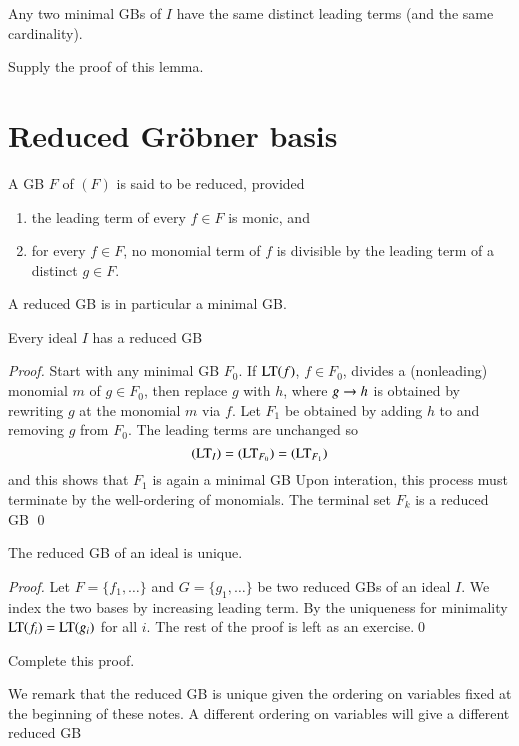 \documentclass{llncs}
\begin{document}
\begin{lemma}  Any two minimal GBs of $I$ have the same distinct leading terms (and the same cardinality).
\end{lemma}

\begin{problem} Supply the proof of this lemma.
\end{problem}


\section{Reduced Gr\"obner basis}

A GB $F$ of $(F)$ is said to be reduced, provided
\begin{enumerate}
\item  the leading term of every $f\in F$ is monic, and
\item  for every $f\in F$, no monomial term of $f$ is divisible by the leading term of a distinct $g\in F$.
\end{enumerate}

A reduced GB is in particular a minimal GB.

\begin{lemma} Every ideal $I$ has a reduced GB
\end{lemma}

\begin{proof}
Start with any minimal GB $F_0$.  If ${\hbox{LT}}(f)$, $f\in F_0$, 
divides a (nonleading) monomial $m$ of $g\in F_0$, then 
replace $g$ with $h$, where $g\rightarrow h$
is obtained by rewriting $g$ at the monomial $m$ via $f$.   Let $F_1$ be obtained by adding $h$ to and removing $g$ from $F_0$.  The leading terms are unchanged so
\[
({\hbox{LT}}_I) = ({\hbox{LT}}_{F_0})=({\hbox{LT}}_{F_1})
\]
and this shows that $F_1$ is again a minimal GB  Upon interation, 
this process must terminate
by the well-ordering of monomials.  The terminal set $F_k$ is a reduced GB
\qed
\end{proof}

\begin{lemma}  The reduced GB of an ideal is unique.
\end{lemma}

\begin{proof}  Let $F=\{f_1,\ldots\}$ and $G=\{g_1,\ldots\}$ 
be two reduced GBs of an ideal $I$. We index the two bases by increasing
leading term.  By the uniqueness for minimality ${\hbox{LT}}(f_i)={\hbox{LT}}(g_i)$ for all
$i$.  The rest of the proof is left as an exercise.\qed
\end{proof}


\begin{problem} Complete this proof.
\end{problem}


We remark that the reduced GB is unique given the ordering on variables fixed
at the beginning of these notes.   A different ordering on variables will give a different
reduced GB
\end{document}
